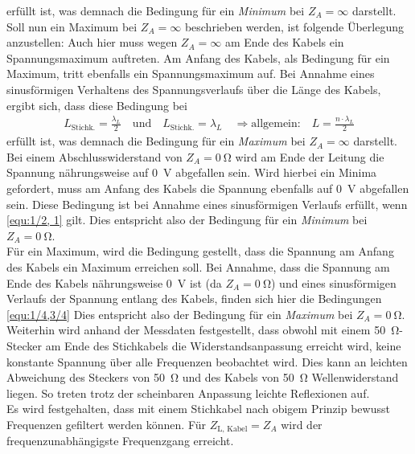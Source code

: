\documentclass[a4paper,twoside,final]{article}
\begin{document}
erfüllt ist, was demnach die Bedingung für ein \textit{Minimum} bei $Z_A = \infty$ darstellt.\\
Soll nun ein Maximum bei $Z_A = \infty$ beschrieben werden, ist folgende Überlegung anzustellen: Auch hier muss wegen $Z_A=\infty$ am Ende des Kabels ein Spannungsmaximum auftreten. Am Anfang des Kabels, als Bedingung für ein Maximum, tritt ebenfalls ein Spannungsmaximum auf. Bei Annahme eines sinusförmigen Verhaltens des Spannungsverlaufs über die Länge des Kabels, ergibt sich, dass diese Bedingung bei
\begin{align}\label{equ:1/2, 1}
L_{\text{Stichk.}} = \frac{\lambda_{L}}{2} \quad \text{und} \quad L_{\text{Stichk.}} = \lambda_{L} \quad \Rightarrow \text{allgemein:}\quad L = \frac{n \cdot \lambda_{L}}{2}
\end{align}
erfüllt ist, was demnach die Bedingung für ein \textit{Maximum}  bei $Z_A = \infty$ darstellt.\\
Bei einem Abschlusswiderstand von $Z_A = \SI{0}{\ohm}$ wird am Ende der Leitung die Spannung nährungsweise auf \SI{0}{\volt} abgefallen sein. Wird hierbei ein Minima gefordert, muss am Anfang des Kabels die Spannung ebenfalls auf \SI{0}{\volt} abgefallen sein. Diese Bedingung ist bei Annahme eines sinusförmigen Verlaufs erfüllt, wenn \eqref{equ:1/2, 1} gilt. Dies entspricht also der Bedingung für ein \textit{Minimum} bei $Z_A = \SI{0}{\ohm}$.\\
Für ein Maximum, wird die Bedingung gestellt, dass die Spannung am Anfang des Kabels ein Maximum erreichen soll. Bei Annahme, dass die Spannung am Ende des Kabels nährungsweise \SI{0}{\volt} ist (da $Z_A = \SI{0}{\ohm}$) und eines sinusförmigen Verlaufs der Spannung entlang des Kabels, finden sich hier die Bedingungen \eqref{equ:1/4,3/4}
Dies entspricht also der Bedingung für ein \textit{Maximum}  bei $Z_A = \SI{0}{\ohm}$.\\
Weiterhin wird anhand der Messdaten festgestellt, dass obwohl mit einem \SI{50}{\ohm}-Stecker am Ende des Stichkabels die Widerstandsanpassung erreicht wird, keine konstante Spannung über alle Frequenzen beobachtet wird. Dies kann an leichten Abweichung des Steckers von \SI{50}{\ohm} und des Kabels von \SI{50}{\ohm} Wellenwiderstand liegen. So treten trotz der scheinbaren Anpassung leichte Reflexionen auf. \\
Es wird festgehalten, dass mit einem Stichkabel nach obigem Prinzip bewusst Frequenzen gefiltert werden können. Für $Z_\text{L, Kabel} = Z_A$ wird der frequenzunabhängigste Frequenzgang erreicht.\\
\end{document}
